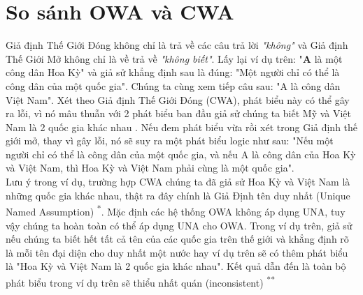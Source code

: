 \section{So sánh OWA và CWA}
Giả định Thế Giới Đóng không chỉ là trả về các câu trả lời \textit{"không"} và Giả định Thế Giới Mở không chỉ là về trả về \textit{"không biết"}. Lấy lại ví dụ trên: "\textbf{A} là một công dân Hoa Kỳ" và giả sử khẳng định sau là đúng: "Một người chỉ có thể là công dân của một quốc gia". Chúng ta cùng xem tiếp câu sau: "A là công dân Việt Nam". Xét theo Giả định Thế Giới Đóng (CWA), phát biểu này có thể gây ra lỗi, vì nó mâu thuẫn với 2 phát biểu ban đầu giả sử chúng ta biết Mỹ và Việt Nam là 2 quốc gia khác nhau . Nếu đem phát biểu vừa rồi xét trong Giả định thế giới mở, thay vì gây lỗi, nó sẽ suy ra một phát biểu logic như sau: "Nếu một người chỉ có thể là công dân của một quốc gia, và nếu A là công dân của Hoa Kỳ và Việt Nam, thì Hoa Kỳ và Việt Nam phải cùng là một quốc gia".
{\let\thefootnote\relax{}
\let\thefootnote\relax{}
}
\\Lưu ý trong ví dụ, trường hợp CWA chúng ta đã giả sử Hoa Kỳ và Việt Nam là những quốc gia khác nhau, thật ra đây chính là Giả Định tên duy nhất (Unique Named Assumption) \textsuperscript{*}. Mặc định các hệ thống OWA không áp dụng UNA, tuy vậy chúng ta hoàn toàn có thể áp dụng UNA cho OWA. Trong ví dụ trên, giả sử nếu chúng ta biết hết tất cả tên của các quốc gia trên thế giới và khẳng định rõ là mỗi tên đại diện cho duy nhất một nước hay ví dụ trên sẽ có thêm phát biểu là "Hoa Kỳ và Việt Nam là 2 quốc gia khác nhau". Kết quả dẫn đến là toàn bộ phát biểu trong ví dụ trên sẽ thiểu nhất quán (inconsistent) \textsuperscript{**}
\clearpage
